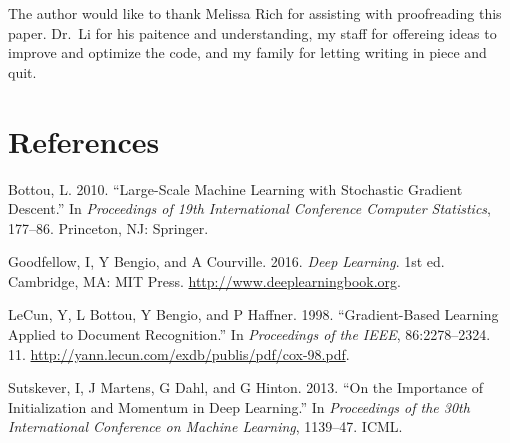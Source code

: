 \documentclass[conference,final,]{IEEEtran}
\begin{document}
The author would like to thank Melissa Rich for assisting with
proofreading this paper. Dr.~Li for his paitence and understanding, my
staff for offereing ideas to improve and optimize the code, and my
family for letting writing in piece and quit.

\newpage

\section*{References}\label{references}

\hypertarget{refs}{}
\hypertarget{ref-sgd2010}{}
Bottou, L. 2010. ``Large-Scale Machine Learning with Stochastic Gradient
Descent.'' In \emph{Proceedings of 19th International Conference
Computer Statistics}, 177--86. Princeton, NJ: Springer.

\hypertarget{ref-goodfellow2016}{}
Goodfellow, I, Y Bengio, and A Courville. 2016. \emph{Deep Learning}.
1st ed. Cambridge, MA: MIT Press. \url{http://www.deeplearningbook.org}.

\hypertarget{ref-lecun1998}{}
LeCun, Y, L Bottou, Y Bengio, and P Haffner. 1998. ``Gradient-Based
Learning Applied to Document Recognition.'' In \emph{Proceedings of the
IEEE}, 86:2278--2324. 11.
\url{http://yann.lecun.com/exdb/publis/pdf/cox-98.pdf}.

\hypertarget{ref-sgd2013}{}
Sutskever, I, J Martens, G Dahl, and G Hinton. 2013. ``On the Importance
of Initialization and Momentum in Deep Learning.'' In \emph{Proceedings
of the 30th International Conference on Machine Learning}, 1139--47.
ICML.
\end{document}
